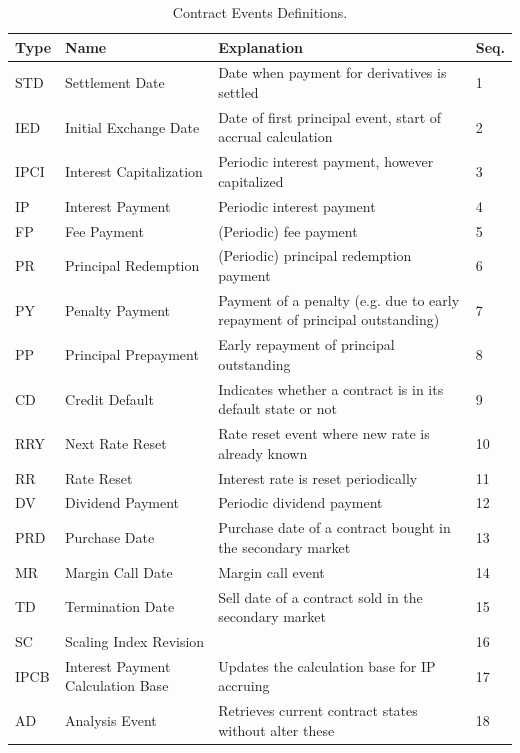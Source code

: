 \documentclass[9pt,oneside]{amsart}
\begin{document}
\begin{multicols}{2}
\begin{table}[H]
	\begin{tabular}{| p{0.23in}p{0.7in}p{1.4in}p{0.2in} |}
	\hline
	\textbf{Type} & \textbf{Name} & \textbf{Explanation} & \textbf{Seq.} \\
	\hline
	STD & Settlement Date & Date when payment for derivatives is settled & 1 \\
	\hline
	IED & Initial Exchange Date & Date of first principal event, start of accrual calculation & 2 \\
	\hline
	IPCI & Interest Capitalization & Periodic interest payment, however capitalized & 3 \\
	\hline
	IP & Interest Payment & Periodic interest payment & 4 \\
	\hline
	FP & Fee Payment & (Periodic) fee payment & 5 \\
	\hline
	PR & Principal Redemption & (Periodic) principal redemption payment & 6 \\
	\hline
	PY & Penalty Payment & Payment of a penalty (e.g. due to early repayment of principal outstanding) & 7 \\
	\hline
	PP & Principal Prepayment & Early repayment of principal outstanding & 8 \\
	\hline
	CD & Credit Default & Indicates whether a contract is in its default state or not & 9 \\
	\hline
	RRY & Next Rate Reset & Rate reset event where new rate is already known & 10 \\
	\hline
	RR & Rate Reset & Interest rate is reset periodically & 11 \\
	\hline
	DV & Dividend Payment & Periodic dividend payment & 12 \\
	\hline
	PRD & Purchase Date & Purchase date of a contract bought in the secondary market & 13 \\
	\hline
	MR & Margin Call Date & Margin call event & 14 \\
	\hline
	TD & Termination Date & Sell date of a contract sold in the secondary market & 15 \\
	\hline
	SC & Scaling Index Revision & & 16 \\
	\hline
	IPCB & Interest Payment Calculation Base & Updates the calculation base for IP accruing & 17 \\
	\hline
	AD & Analysis Event & Retrieves current contract states without alter these & 18 \\
	\hline
	\end{tabular}
	\caption{Contract Events Definitions.}
	\label{tbl:events}
\end{table}







\end{multicols}
\newpage
\end{document}
